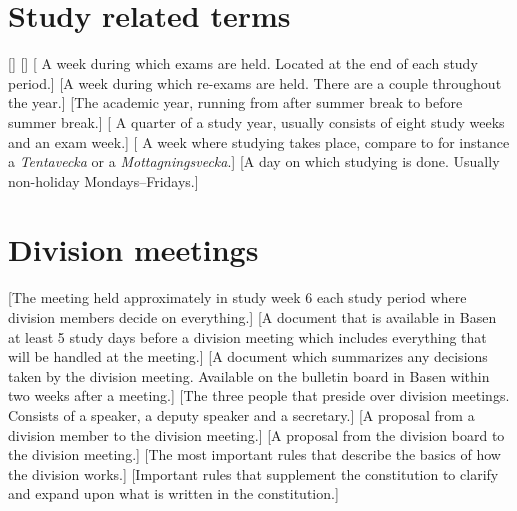 \documentclass[a4paper]{article}
\begin{document}
\section{Study related terms}
\begin{description}
    []
    []
    [ A week during which exams are held. Located at the end of each study period.]
    [A week during which re-exams are held. There are a couple throughout the year.]
    [The academic year, running from after summer break to before summer break.]
    [ A quarter of a study year, usually consists of eight study weeks and an exam week.]
    [ A week where studying takes place, compare to for instance a \textit{Tentavecka} or a \textit{Mottagningsvecka}.]
    [A day on which studying is done. Usually non-holiday Mondays--Fridays.]
\end{description}

\section{Division meetings}
\begin{description}
    [The meeting held approximately in study week 6 each study period where division members decide on everything.]
    [A document that is available in Basen at least 5 study days before a division meeting which includes everything that will be handled at the meeting.]
    [A document which summarizes any decisions taken by the division meeting. Available on the bulletin board in Basen within two weeks after a meeting.]
    [The three people that preside over division meetings. Consists of a speaker, a deputy speaker and a secretary.]
    [A proposal from a division member to the division meeting.]
    [A proposal from the division board to the division meeting.]
    [The most important rules that describe the basics of how the division works.]
    [Important rules that supplement the constitution to clarify and expand upon what is written in the constitution.]
\end{description}
\end{document}
